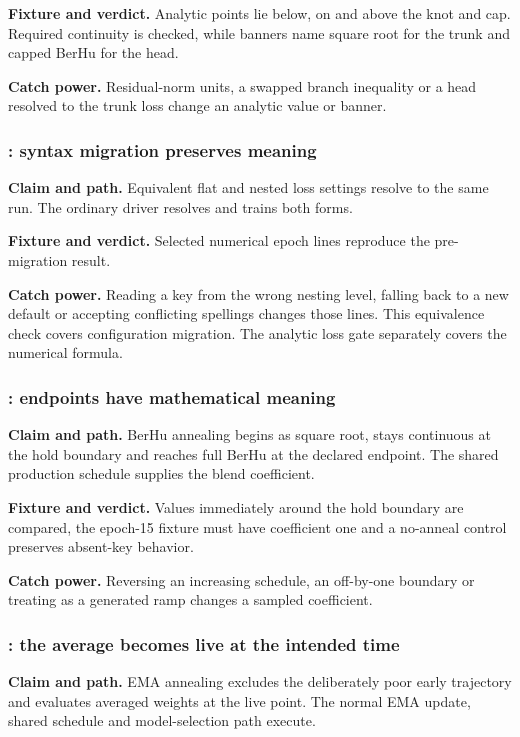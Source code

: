 \textbf{Fixture and verdict.}  Analytic points lie below, on and above the
knot and cap.  Required continuity is checked, while banners name square root
for the trunk and capped BerHu for the head.

\textbf{Catch power.}  Residual-norm units, a swapped branch inequality or a
head resolved to the trunk loss change an analytic value or banner.

\subsubsection{: syntax migration preserves meaning}

\textbf{Claim and path.}  Equivalent flat and nested loss settings resolve to
the same run.  The ordinary driver resolves and trains both forms.

\textbf{Fixture and verdict.}  Selected numerical epoch lines reproduce the
pre-migration result.

\textbf{Catch power.}  Reading a key from the wrong nesting level, falling
back to a new default or accepting conflicting spellings changes those
lines.  This equivalence check covers configuration migration.  The analytic
loss gate separately covers the numerical formula.

\subsubsection{: endpoints have mathematical meaning}

\textbf{Claim and path.}  BerHu annealing begins as square root, stays
continuous at the hold boundary and reaches full BerHu at the declared
endpoint.  The shared production schedule supplies the blend coefficient.

\textbf{Fixture and verdict.}  Values immediately around the hold boundary
are compared, the epoch-15 fixture must have coefficient one and a no-anneal
control preserves absent-key behavior.

\textbf{Catch power.}  Reversing an increasing schedule, an off-by-one
boundary or treating  as a generated ramp changes a sampled
coefficient.

\subsubsection{: the average becomes live at the intended time}

\textbf{Claim and path.}  EMA annealing excludes the deliberately poor early
trajectory and evaluates averaged weights at the live point.  The normal EMA
update, shared schedule and model-selection path execute.

